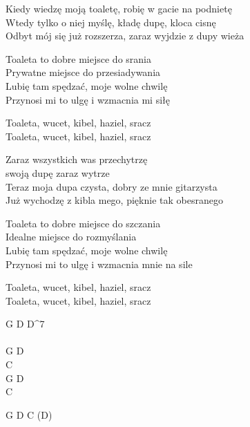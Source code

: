 \begin{text}
Kiedy wiedzę moją toaletę, robię w gacie na podnietę\\
Wtedy tylko o niej myślę, kładę dupę, kloca cisnę\\
Odbyt mój się już rozszerza, zaraz wyjdzie z dupy wieża

Toaleta to dobre miejsce do srania\\
Prywatne miejsce do przesiadywania\\
Lubię tam spędzać, moje wolne chwilę\\
Przynosi mi to ulgę i wzmacnia mi siłę

\vin Toaleta, wucet, kibel, haziel, sracz\\
\vin Toaleta, wucet, kibel, haziel, sracz

Zaraz wszystkich was przechytrzę\\
swoją dupę zaraz wytrze\\
Teraz moja dupa czysta, dobry ze mnie gitarzysta\\
Już wychodzę z kibla mego, pięknie tak obesranego

Toaleta to dobre miejsce do szczania\\
Idealne miejsce do rozmyślania\\
Lubię tam spędzać, moje wolne chwilę\\
Przynosi mi to ulgę i wzmacnia mnie na sile

\vin Toaleta, wucet, kibel, haziel, sracz\\
\vin Toaleta, wucet, kibel, haziel, sracz
\end{text}
\begin{chord}
    G D D^7\\
	\\
	
	G D\\
	C\\
	G D\\
	C
	
	G D C (D)
\end{chord}